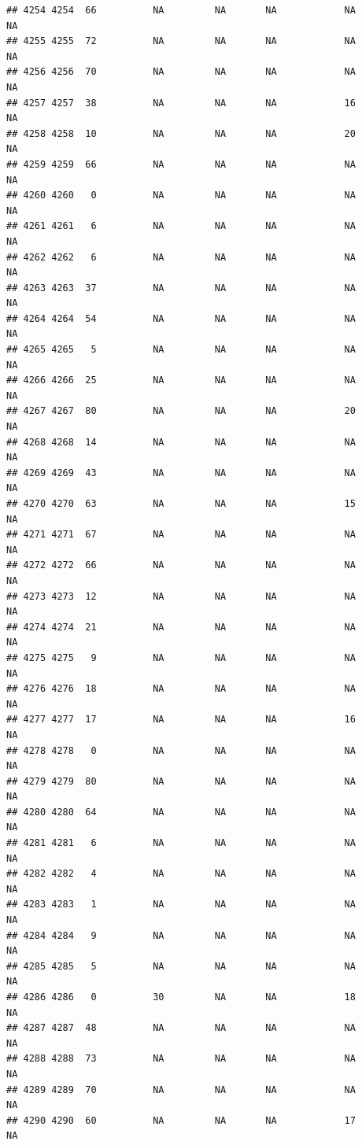 \documentclass[man]{apa6}
\begin{document}
\begin{verbatim}
## 4254 4254  66          NA         NA       NA            NA       NA
## 4255 4255  72          NA         NA       NA            NA       NA
## 4256 4256  70          NA         NA       NA            NA       NA
## 4257 4257  38          NA         NA       NA            16       NA
## 4258 4258  10          NA         NA       NA            20       NA
## 4259 4259  66          NA         NA       NA            NA       NA
## 4260 4260   0          NA         NA       NA            NA       NA
## 4261 4261   6          NA         NA       NA            NA       NA
## 4262 4262   6          NA         NA       NA            NA       NA
## 4263 4263  37          NA         NA       NA            NA       NA
## 4264 4264  54          NA         NA       NA            NA       NA
## 4265 4265   5          NA         NA       NA            NA       NA
## 4266 4266  25          NA         NA       NA            NA       NA
## 4267 4267  80          NA         NA       NA            20       NA
## 4268 4268  14          NA         NA       NA            NA       NA
## 4269 4269  43          NA         NA       NA            NA       NA
## 4270 4270  63          NA         NA       NA            15       NA
## 4271 4271  67          NA         NA       NA            NA       NA
## 4272 4272  66          NA         NA       NA            NA       NA
## 4273 4273  12          NA         NA       NA            NA       NA
## 4274 4274  21          NA         NA       NA            NA       NA
## 4275 4275   9          NA         NA       NA            NA       NA
## 4276 4276  18          NA         NA       NA            NA       NA
## 4277 4277  17          NA         NA       NA            16       NA
## 4278 4278   0          NA         NA       NA            NA       NA
## 4279 4279  80          NA         NA       NA            NA       NA
## 4280 4280  64          NA         NA       NA            NA       NA
## 4281 4281   6          NA         NA       NA            NA       NA
## 4282 4282   4          NA         NA       NA            NA       NA
## 4283 4283   1          NA         NA       NA            NA       NA
## 4284 4284   9          NA         NA       NA            NA       NA
## 4285 4285   5          NA         NA       NA            NA       NA
## 4286 4286   0          30         NA       NA            18       NA
## 4287 4287  48          NA         NA       NA            NA       NA
## 4288 4288  73          NA         NA       NA            NA       NA
## 4289 4289  70          NA         NA       NA            NA       NA
## 4290 4290  60          NA         NA       NA            17       NA

\end{verbatim}
\end{document}
